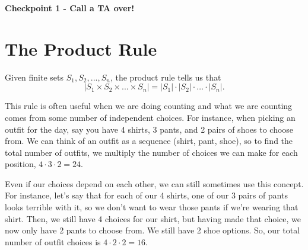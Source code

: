 \documentclass[12pt,letterpaper]{article}
\newenvironment{22itemize}{\begin{itemize}\itemsep0em}{\end{itemize}}
\begin{document}

\textbf{Checkpoint 1 - Call a TA over!}

  \pagebreak
  
  \section*{The Product Rule}
  
  Given finite sets $S_1, S_2, ..., S_n$, the product rule tells us that $$|S_1 \times S_2 \times ... \times S_n| = |S_1| \cdot |S_2| \cdot \ldots \cdot|S_n|.$$
  
  This rule is often useful when we are doing counting and what we are counting comes from some number of independent choices. For instance, when picking an outfit for the day, say you have 4 shirts, 3 pants, and 2 pairs of shoes to choose from. We can think of an outfit as a sequence (shirt, pant, shoe), so to find the total number of outfits, we multiply the number of choices we can make for each position, $4 \cdot 3 \cdot 2=24$.
  
  Even if our choices depend on each other, we can still sometimes use this concept. For instance, let's say that for each of our 4 shirts, one of our 3 pairs of pants looks terrible with it, so we don't want to wear those pants if we're wearing that shirt. Then, we still have 4 choices for our shirt, but having made that choice, we now only have 2 pants to choose from. We still have 2 shoe options. So, our total number of outfit choices is $4 \cdot 2 \cdot 2=16$.
  
\end{document}
